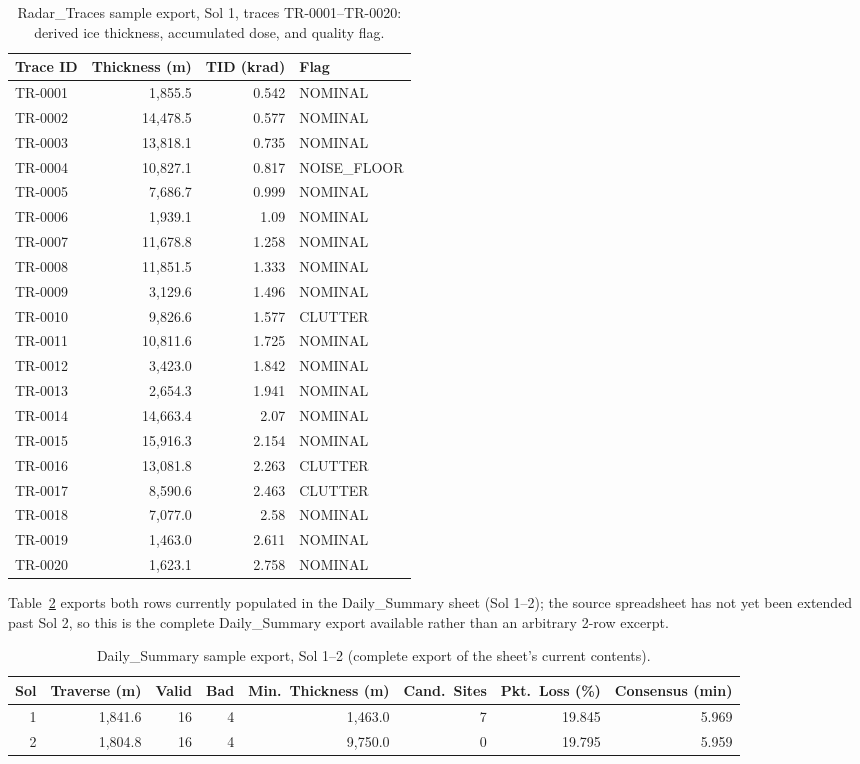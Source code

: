 \documentclass[11pt]{article}
\begin{document}
\begin{table}[H]
\centering
\footnotesize
\begin{tabular}{lrrl}
\toprule
Trace ID & Thickness (m) & TID (krad) & Flag \\
\midrule
TR-0001 & 1{,}855.5 & 0.542 & NOMINAL \\
TR-0002 & 14{,}478.5 & 0.577 & NOMINAL \\
TR-0003 & 13{,}818.1 & 0.735 & NOMINAL \\
TR-0004 & 10{,}827.1 & 0.817 & NOISE\_FLOOR \\
TR-0005 & 7{,}686.7 & 0.999 & NOMINAL \\
TR-0006 & 1{,}939.1 & 1.09 & NOMINAL \\
TR-0007 & 11{,}678.8 & 1.258 & NOMINAL \\
TR-0008 & 11{,}851.5 & 1.333 & NOMINAL \\
TR-0009 & 3{,}129.6 & 1.496 & NOMINAL \\
TR-0010 & 9{,}826.6 & 1.577 & CLUTTER \\
TR-0011 & 10{,}811.6 & 1.725 & NOMINAL \\
TR-0012 & 3{,}423.0 & 1.842 & NOMINAL \\
TR-0013 & 2{,}654.3 & 1.941 & NOMINAL \\
TR-0014 & 14{,}663.4 & 2.07 & NOMINAL \\
TR-0015 & 15{,}916.3 & 2.154 & NOMINAL \\
TR-0016 & 13{,}081.8 & 2.263 & CLUTTER \\
TR-0017 & 8{,}590.6 & 2.463 & CLUTTER \\
TR-0018 & 7{,}077.0 & 2.58 & NOMINAL \\
TR-0019 & 1{,}463.0 & 2.611 & NOMINAL \\
TR-0020 & 1{,}623.1 & 2.758 & NOMINAL \\
\bottomrule
\end{tabular}
\caption{Radar\_Traces sample export, Sol 1, traces TR-0001--TR-0020: derived ice thickness,
accumulated dose, and quality flag.}
\label{tab:sample-record-2}
\end{table}

Table~\ref{tab:sample-daily} exports both rows currently populated in the Daily\_Summary sheet
(Sol 1--2); the source spreadsheet has not yet been extended past Sol 2, so this is the complete
Daily\_Summary export available rather than an arbitrary 2-row excerpt.

\begin{table}[H]
\centering
\footnotesize
\begin{tabular}{rrrrrrrr}
\toprule
Sol & Traverse (m) & Valid & Bad & Min.\ Thickness (m) & Cand.\ Sites & Pkt.\ Loss (\%) &
Consensus (min) \\
\midrule
1 & 1{,}841.6 & 16 & 4 & 1{,}463.0 & 7 & 19.845 & 5.969 \\
2 & 1{,}804.8 & 16 & 4 & 9{,}750.0 & 0 & 19.795 & 5.959 \\
\bottomrule
\end{tabular}
\caption{Daily\_Summary sample export, Sol 1--2 (complete export of the sheet's current
contents).}
\label{tab:sample-daily}
\end{table}
\end{document}
